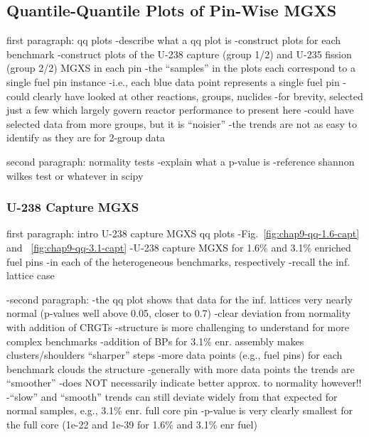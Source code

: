 \subsection{Quantile-Quantile Plots of Pin-Wise MGXS}
\label{subsec:chap9-qq-plots}

first paragraph: qq plots
-describe what a qq plot is
-construct plots for each benchmark
-construct plots of the U-238 capture (group 1/2) and U-235 fission (group 2/2) \ac{MGXS} in each pin
  -the ``samples'' in the plots each correspond to a single fuel pin instance
    -i.e., each blue data point represents a single fuel pin
-could clearly have looked at other reactions, groups, nuclides
  -for brevity, selected just a few which largely govern reactor performance to present here
  -could have selected data from more groups, but it is ``noisier''
    -the trends are not as easy to identify as they are for 2-group data

second paragraph: normality tests
-explain what a p-value is
-reference shannon wilkes test or whatever in scipy


\subsubsection{U-238 Capture MGXS}
\label{subsubsec:chap9-qq-plots-capt}

first paragraph: intro U-238 capture \ac{MGXS} qq plots
-Fig.~\ref{fig:chap9-qq-1.6-capt} and ~\ref{fig:chap9-qq-3.1-capt}
  -U-238 capture \ac{MGXS} for 1.6\% and 3.1\% enriched fuel pins
  -in each of the heterogeneous benchmarks, respectively
-recall the inf. lattice case

-second paragraph:
  -the qq plot shows that data for the inf. lattices very nearly normal (p-values well above 0.05, closer to 0.7)
  -clear deviation from normality with addition of \acp{CRGT}
  -structure is more challenging to understand for more complex benchmarks
    -addition of \acp{BP} for 3.1\% enr. assembly makes clusters/shoulders ``sharper'' steps
    -more data points (e.g., fuel pins) for each benchmark clouds the structure
	  -generally with more data points the trends are ``smoother''
	    -does NOT necessarily indicate better approx. to normality however!!
	    -``slow'' and ``smooth'' trends can still deviate widely from that expected for normal samples, e.g., 3.1\% enr. full core pin
  -p-value is very clearly smallest for the full core (1e-22 and 1e-39 for 1.6\% and 3.1\% enr fuel)

